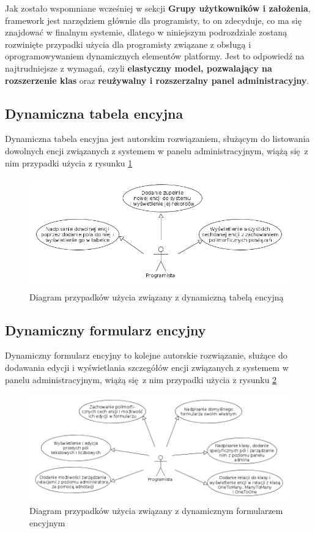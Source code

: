 Jak zostało wspomniane wcześniej w sekcji \textbf{Grupy użytkowników i założenia}, framework jest narzędziem głównie dla programisty, to on zdecyduje, co ma się znajdować w finalnym systemie, dlatego w niniejszym podrozdziale zostaną rozwinięte przypadki użycia dla programisty związane z obsługą i oprogramowywaniem dynamicznych elementów platformy. Jest to odpowiedź na najtrudniejsze z wymagań, czyli \textbf{elastyczny model, pozwalający na rozszerzenie klas} oraz \textbf{reużywalny i rozszerzalny panel administracyjny}.
\subsection{Dynamiczna tabela encyjna}
Dynamiczna tabela encyjna jest autorskim rozwiązaniem, służącym do listowania dowolnych encji związanych z systemem w panelu administracyjnym, wiążą się z nim przypadki użycia z rysunku \ref{dynEntTabUC}
\begin{figure}[H]
	\begin{center}
		\includegraphics[scale=0.5]{dynEntTabUC.png}
	\end{center}
	\caption{{\color{black}Diagram przypadków użycia związany z dynamiczną tabelą encyjną}} \label{dynEntTabUC}
\end{figure}

\subsection{Dynamiczny formularz encyjny}
Dynamiczny formularz encyjny to kolejne autorskie rozwiązanie, służące do dodawania edycji i wyświetlania szczegółów encji związanych z systemem w panelu administracyjnym, wiążą się z nim przypadki użycia z rysunku \ref{dynEntFormUC}
\begin{figure}[H]
	\begin{center}
		\includegraphics[scale=0.5]{dynEntFormUC.png}
	\end{center}
	\caption{{\color{black}Diagram przypadków użycia związany z dynamicznym formularzem encyjnym}} \label{dynEntFormUC}
\end{figure}

